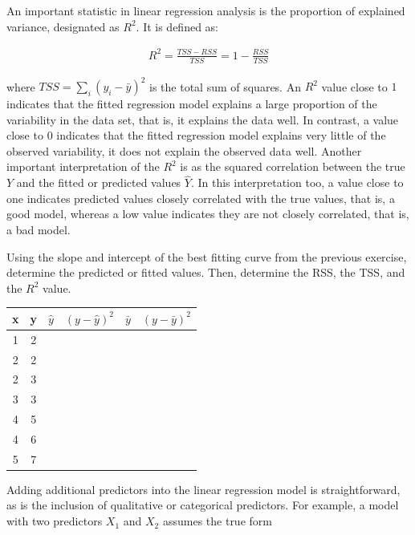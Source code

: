 An important statistic in linear regression analysis is the proportion of explained variance, designated as $R^2$. It is defined as:

\begin{align*}
R^2 = \frac{TSS - RSS}{TSS} = 1 - \frac{RSS}{TSS}
\end{align*}

\noindent where $TSS = \sum_i(y_i - \bar{y})^2$ is the total sum of squares. An $R^2$ value close to $1$ indicates that the fitted regression model explains a large proportion of the variability in the data set, that is, it explains the data well. In contrast, a value close to $0$ indicates that the fitted regression model explains very little of the observed variability, it does not explain the observed data well. Another important interpretation of the $R^2$ is as the squared correlation between the true $Y$ and the fitted or predicted values $\hat{Y}$. In this interpretation too, a value close to one indicates predicted values closely correlated with the true values, that is, a good model, whereas a low value indicates they are not closely correlated, that is, a bad model.

\begin{exerciseboxpaper}
Using the slope and intercept of the best fitting curve from the previous exercise, determine the predicted or fitted values. Then, determine the RSS, the TSS, and the $R^2$ value.\\

\begin{center}
\renewcommand{\arraystretch}{1.25}
\begin{tabular}{c|c|c|c|c|c} \hline
{\bf x} & {\bf y} & $\hat{y}$ & $(y - \hat{y})^2$ & $\bar{y}$ & $(y - \bar{y})^2$ \\ \hline
1 & 2 & & & &\\
2 & 2 & & & & \\
2 & 3 & & & & \\
3 & 3 & & & & \\ 
4 & 5 & & & & \\
4 & 6 & & & & \\
5 & 7 & & & & \\ \hline
\end{tabular}
\end{center}
\end{exerciseboxpaper}

Adding additional predictors into the linear regression model is straightforward, as is the inclusion of qualitative or categorical predictors. For example, a model with two predictors $X_1$ and $X_2$ assumes the true form

